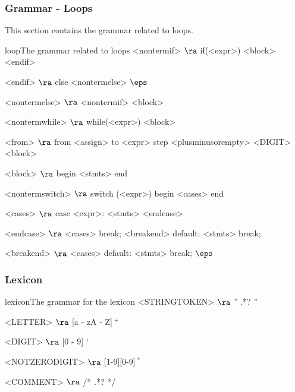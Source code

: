 \subsubsection{Grammar - Loops}
This section contains the grammar related to loops.
\begin{grammatik}{loop}{The grammar related to loops}
<nontermif> $\ra$ if(<expr>)
	<block>
	<endif>

<endif> $\ra$ 
	else <nontermelse>
	\alt$\eps$

<nontermelse> $\ra$ <nontermif>
	\alt <block>

<nontermwhile> $\ra$ while(<expr>)
		<block>
		
<from> $\ra$ from <assign> to <expr> step <plusminusorempty> <DIGIT>
	<block>

<block> $\ra$ 
	begin
		<stmts>
	end

<nontermswitch> $\ra$ switch (<expr>)
		begin
			<cases>
		end

<cases> $\ra$ case <expr>:
			<stmts>
		<endcase>
		
<endcase> $\ra$ <cases>
		\alt break; <breakend>
		\alt default:
			<stmts>
			break;

<breakend> $\ra$ <cases>
\alt default:
<stmts>
break;
\alt$\eps$
\end{grammatik}

\subsubsection{Lexicon}

\begin{grammatik}{lexicon}{The grammar for the lexicon}
<STRINGTOKEN> $\ra$ '' .*? '' 

<LETTER> $\ra$ [a - zA - Z]$~^+$

<DIGIT> $\ra$ [0 - 9]$~^+$

<NOTZERODIGIT> $\ra$ [1-9][0-9]$~^*$

<COMMENT> $\ra$ /* .*? */


\end{grammatik}